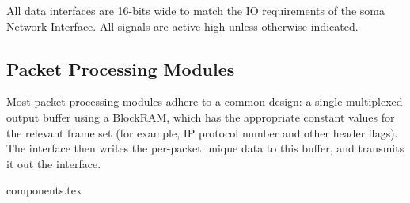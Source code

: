 All data interfaces are 16-bits wide to match the IO requirements of
the soma Network Interface. All signals are active-high unless
otherwise indicated.


\subsection{Packet Processing Modules}
Most packet processing modules adhere to a common design: a single
multiplexed output buffer using a BlockRAM, which has the appropriate
constant values for the relevant frame set (for example, IP protocol
number and other header flags). The interface then writes the
per-packet unique data to this buffer, and transmits it out the
interface.

{components.tex}

